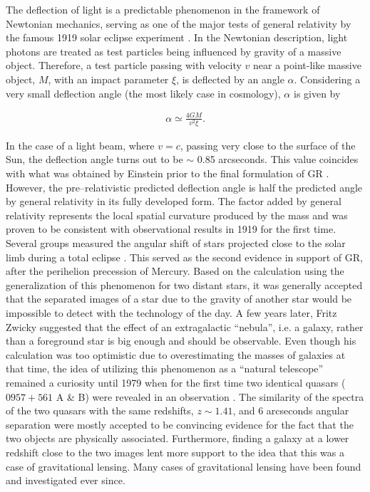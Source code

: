 \documentclass[a4wide,12pt]{book}
\begin{document}
The deflection of light is a predictable phenomenon in the framework of Newtonian mechanics, serving as one of the major tests of general relativity by the famous 1919 solar eclipse experiment \citep[][]{Eddington1919}. In the Newtonian description, light photons are treated as test particles being influenced by gravity of a massive object. Therefore, a test particle passing with velocity $v$ near a point-like massive object, $M$, with an impact parameter $\xi$, is deflected by an angle $\alpha$. Considering a very small deflection angle (the most likely case in cosmology), $\alpha$ is given by

\begin{eqnarray}
\label{eq:alpha}
\alpha \simeq \frac{4GM}{v^2 \xi}.
\end{eqnarray}

In the case of a light beam, where $v = c$, passing very close to the surface of the Sun, the deflection angle turns out to be $\sim$ 0.85 arcseconds. This value coincides with what was obtained by Einstein prior to the final formulation of GR \citep[][]{Einstein1911}. However, the pre--relativistic predicted deflection angle is half the predicted angle by general relativity in its fully developed form. The factor added by general relativity represents the local spatial curvature produced by the mass and was proven to be consistent with observational results in 1919 for the first time. Several groups measured the angular shift of stars projected close to the solar limb during a total eclipse \citet{Eddington1919}. This served as the second evidence in support of GR, after the perihelion precession of Mercury. Based on the calculation using the generalization of this phenomenon for two distant stars, it was generally accepted that the separated images of a star due to the gravity of another star would be impossible to detect with the technology of the day. A few years later, Fritz Zwicky suggested  \citep{Zwicky1937} that the effect of an extragalactic ``nebula'', i.e. a galaxy, rather than a foreground star is big enough and should be observable. Even though his calculation was too optimistic due to overestimating the masses of galaxies at that time, the idea of utilizing this phenomenon as a ``natural telescope''  remained a curiosity until 1979 when for the first time two identical quasars ($0957+561$ A \& B) were revealed in an observation \citep{Walsh+1979}. The similarity of the spectra of the two quasars with the same redshifts, $z \sim 1.41$, and 6 arcseconds angular separation were mostly accepted to be convincing evidence for the fact that the two objects are physically associated. Furthermore, finding a galaxy at a lower redshift close to the two images lent more support to the idea that this was a case of gravitational lensing. Many cases of gravitational lensing have been found and investigated ever since.
\end{document}
